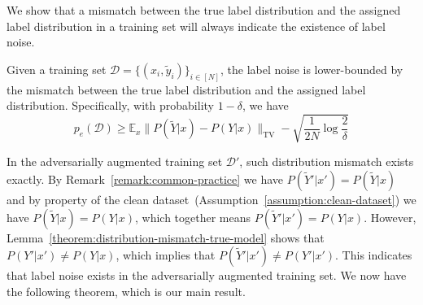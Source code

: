    
   We show that a mismatch between the true label distribution and the assigned label distribution in a training set will always indicate the existence of label noise.
    \begin{lemma}
    \label{theorem:implicit-label-noise}
        Given a training set $\mathcal{D} = \{(x_i, \tilde{y}_i)\}_{i\in[N]}$, the label noise is lower-bounded by the mismatch between the true label distribution and the assigned label distribution. Specifically, with probability $1 - \delta$, we have
        \begin{equation}
        p_e(\mathcal{D}) \ge \mathbb{E}_x \|P(\tilde{Y}| x) - P(Y | x)\|_{\text{TV}} -\sqrt{\frac{1}{2N}\log\frac{2}{\delta}}
        \end{equation}
    \end{lemma}



    In the adversarially augmented training set $\mathcal{D}'$, such distribution mismatch exists exactly. By Remark~\ref{remark:common-practice} we have $P(\tilde{Y}' | x') = P(\tilde{Y}|x)$ and by property of the clean dataset~(Assumption~\ref{assumption:clean-dataset}) we have $P(\tilde{Y}|x) = P(Y|x)$, which together means $P(\tilde{Y}' | x') = P(Y|x)$. However, Lemma~\ref{theorem:distribution-mismatch-true-model} shows that $P(Y' | x') \ne P(Y | x)$, which implies that $P(\tilde{Y}' | x') \ne P(Y' | x')$. This indicates that label noise exists in the adversarially augmented training set.
   We now have the following theorem, which is our main result.
  
